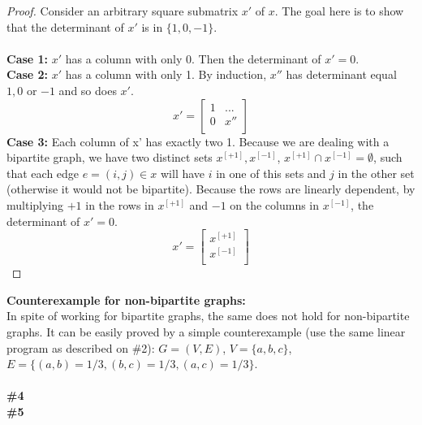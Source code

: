 \documentclass{article}
\begin{document}
\begin{proof}
Consider an arbitrary square submatrix $x'$ of $x$. The goal here is to show that the determinant of $x'$ is in $\{ 1, 0, -1\}$.
\\
\\
\textbf{Case 1:} $x'$ has a column with only 0. Then the determinant of $x' = 0$.
\\
\textbf{Case 2:} $x'$ has a column with only 1. By induction, $x''$ has determinant equal $1, 0$ or $-1$ and so does $x'$.
\[
x' =
\begin{bmatrix}
    1       & ... \\
    0      & x'' \\
\end{bmatrix}
\]
\textbf{Case 3:} Each column of x' has exactly two 1. Because we are dealing with a bipartite graph, we have two distinct sets $x^{[+1]}, x^{[-1]}$, $x^{[+1]} \cap x^{[-1]} = \emptyset$, such that each edge $e=(i,j) \in x$ will have $i$ in one of this sets and $j$ in the other set (otherwise it would not be bipartite). Because the rows are linearly dependent, by multiplying $+1$ in the rows in $x^{[+1]}$ and $-1$ on the columns in $x^{[-1]}$, the determinant of $x' = 0$.
\[
x' =
\begin{bmatrix}
    x^{[+1]}\\
    x^{[-1]}\\
\end{bmatrix}
\]
\end{proof}
\textbf{Counterexample for non-bipartite graphs:}
\\
In spite of working for bipartite graphs, the same does not hold for non-bipartite graphs. It can be easily proved by a simple counterexample (use the same linear program as described on \#2): $G=(V,E)$, $V=\{a, b, c\}$, $E=\{(a,b) = 1/3, (b, c) = 1/3, (a,c) = 1/3\}$.
\\
\\
\textbf{\#4}
\\
\textbf{\#5}
\\
\end{document}
